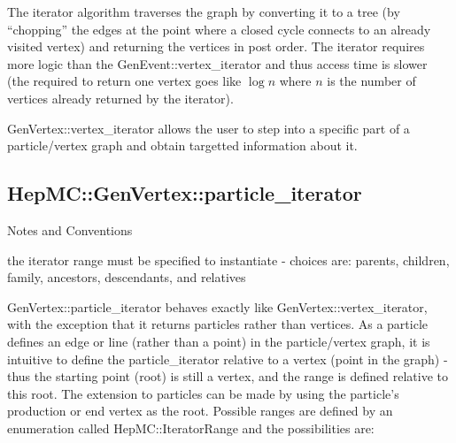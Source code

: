 \documentclass[11pt,letterpaper]{article}
\begin{document}
The iterator algorithm traverses the graph by converting it to a tree
(by ``chopping'' the edges at the point where a closed cycle connects
to an already visited vertex) and returning the vertices in post
order. The iterator requires more logic than the
GenEvent::vertex\_iterator and thus access time is slower (the
required to return one vertex goes like $\log n$ where $n$ is the
number of vertices already returned by the iterator).

GenVertex::vertex\_iterator allows the user to step into a specific part
of a particle/vertex graph and obtain targetted information about it. 

%
%

\subsection{HepMC::GenVertex::particle\_iterator}
\begin{myitemize}{Notes and Conventions}
  \item the iterator range must be specified to instantiate -
    choices are: parents, children, family, ancestors, descendants,
    and relatives 
\end{myitemize}

GenVertex::particle\_iterator behaves exactly like
GenVertex::vertex\_iterator, with the exception that it returns particles
rather than vertices.  As a particle defines an edge or line (rather
than a point) in the particle/vertex graph, it is intuitive to define
the particle\_iterator relative to a vertex (point in the graph) - thus
the starting point (root) is still a vertex, and the range is defined
relative to this root.  The extension to particles can be made by
using the particle's production or end vertex as the root.  Possible
ranges are defined by an enumeration called HepMC::IteratorRange and
the possibilities are:
\begin{itemize}\setlength{\itemsep}{0pt}
\end{itemize}
\end{document}
